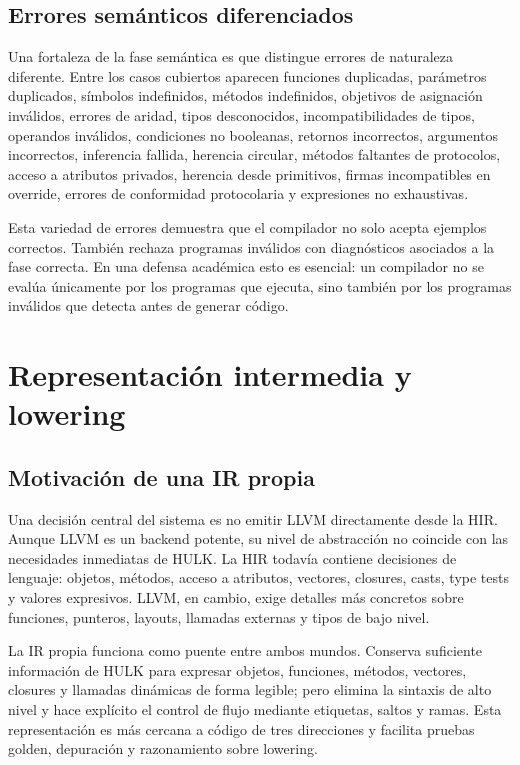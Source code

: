 \documentclass[12pt,letterpaper]{article}
\newcommand{\repo}[1]{\texttt{\detokenize{#1}}}
\newcommand{\hulk}{\textsc{HULK}}
\begin{document}
\subsection{Errores semánticos diferenciados}

Una fortaleza de la fase semántica es que distingue errores de naturaleza diferente. Entre los casos cubiertos aparecen funciones duplicadas, parámetros duplicados, símbolos indefinidos, métodos indefinidos, objetivos de asignación inválidos, errores de aridad, tipos desconocidos, incompatibilidades de tipos, operandos inválidos, condiciones no booleanas, retornos incorrectos, argumentos incorrectos, inferencia fallida, herencia circular, métodos faltantes de protocolos, acceso a atributos privados, herencia desde primitivos, firmas incompatibles en override, errores de conformidad protocolaria y expresiones \repo{match} no exhaustivas.

Esta variedad de errores demuestra que el compilador no solo acepta ejemplos correctos. También rechaza programas inválidos con diagnósticos asociados a la fase correcta. En una defensa académica esto es esencial: un compilador no se evalúa únicamente por los programas que ejecuta, sino también por los programas inválidos que detecta antes de generar código.

\section{Representación intermedia y lowering}

\subsection{Motivación de una IR propia}

Una decisión central del sistema es no emitir LLVM directamente desde la HIR. Aunque LLVM es un backend potente, su nivel de abstracción no coincide con las necesidades inmediatas de \hulk{}. La HIR todavía contiene decisiones de lenguaje: objetos, métodos, acceso a atributos, vectores, closures, casts, type tests y valores expresivos. LLVM, en cambio, exige detalles más concretos sobre funciones, punteros, layouts, llamadas externas y tipos de bajo nivel.

La IR propia funciona como puente entre ambos mundos. Conserva suficiente información de \hulk{} para expresar objetos, funciones, métodos, vectores, closures y llamadas dinámicas de forma legible; pero elimina la sintaxis de alto nivel y hace explícito el control de flujo mediante etiquetas, saltos y ramas. Esta representación es más cercana a código de tres direcciones y facilita pruebas golden, depuración y razonamiento sobre lowering.
\end{document}
